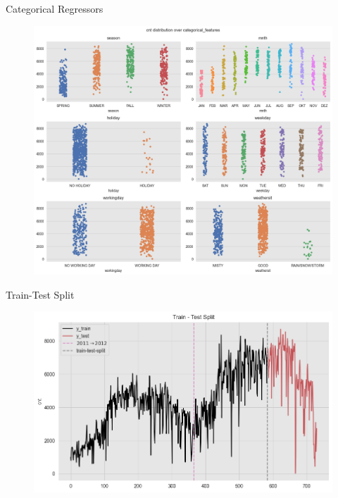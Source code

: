 \documentclass[10pt]{beamer}
\begin{document}
\begin{frame}{Categorical Regressors}
\begin{center}
  \begin{figure}
    \includegraphics[scale=0.3]{images/interpretable_ml_21_0.png} 
  \end{figure}
\end{center}
\end{frame}

\begin{frame}{Train-Test Split}
\begin{center}
  \begin{figure}
    \includegraphics[scale=0.5]{images/interpretable_ml_25_0.png} 
  \end{figure}
\end{center}
\end{frame}
\end{document}
